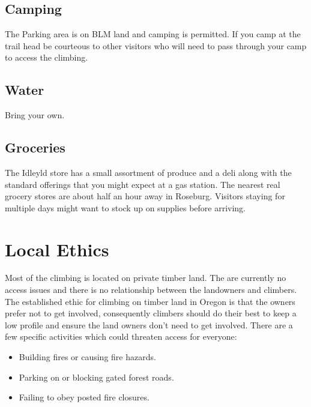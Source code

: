 \subsection*{Camping}
The Parking area is on BLM land and camping is permitted. If you camp at the trail head be courteous to other visitors who will need to pass through your camp to access the climbing.
\subsection*{Water}
Bring your own.
\subsection*{Groceries}
The Idleyld store has a small assortment of produce and a deli along with the standard offerings that you might expect at a gas station. The nearest real grocery stores are about half an hour away in Roseburg. Visitors staying for multiple days might want to stock up on supplies before arriving.
\section{Local Ethics}
Most of the climbing is located on private timber land. The are currently no access issues and there is no relationship between the landowners and climbers. The established ethic for climbing on timber land in Oregon is that the owners prefer not to get involved, consequently climbers should do their best to keep a low profile and ensure the land owners don't need to get involved. There are a few specific activities which could threaten access for everyone:\\
\begin{itemize}
\item Building fires or causing fire hazards.\\
\item Parking on or blocking gated forest roads.\\
\item Failing to obey posted fire closures.\\
\end{itemize}
